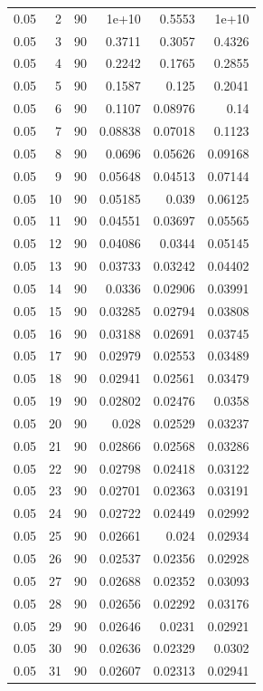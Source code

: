 \begin{tabular}{rrrrrr}
0.05 & 2 & 90 & 1e+10 & 0.5553 & 1e+10 \\
0.05 & 3 & 90 & 0.3711 & 0.3057 & 0.4326 \\
0.05 & 4 & 90 & 0.2242 & 0.1765 & 0.2855 \\
0.05 & 5 & 90 & 0.1587 & 0.125 & 0.2041 \\
0.05 & 6 & 90 & 0.1107 & 0.08976 & 0.14 \\
0.05 & 7 & 90 & 0.08838 & 0.07018 & 0.1123 \\
0.05 & 8 & 90 & 0.0696 & 0.05626 & 0.09168 \\
0.05 & 9 & 90 & 0.05648 & 0.04513 & 0.07144 \\
0.05 & 10 & 90 & 0.05185 & 0.039 & 0.06125 \\
0.05 & 11 & 90 & 0.04551 & 0.03697 & 0.05565 \\
0.05 & 12 & 90 & 0.04086 & 0.0344 & 0.05145 \\
0.05 & 13 & 90 & 0.03733 & 0.03242 & 0.04402 \\
0.05 & 14 & 90 & 0.0336 & 0.02906 & 0.03991 \\
0.05 & 15 & 90 & 0.03285 & 0.02794 & 0.03808 \\
0.05 & 16 & 90 & 0.03188 & 0.02691 & 0.03745 \\
0.05 & 17 & 90 & 0.02979 & 0.02553 & 0.03489 \\
0.05 & 18 & 90 & 0.02941 & 0.02561 & 0.03479 \\
0.05 & 19 & 90 & 0.02802 & 0.02476 & 0.0358 \\
0.05 & 20 & 90 & 0.028 & 0.02529 & 0.03237 \\
0.05 & 21 & 90 & 0.02866 & 0.02568 & 0.03286 \\
0.05 & 22 & 90 & 0.02798 & 0.02418 & 0.03122 \\
0.05 & 23 & 90 & 0.02701 & 0.02363 & 0.03191 \\
0.05 & 24 & 90 & 0.02722 & 0.02449 & 0.02992 \\
0.05 & 25 & 90 & 0.02661 & 0.024 & 0.02934 \\
0.05 & 26 & 90 & 0.02537 & 0.02356 & 0.02928 \\
0.05 & 27 & 90 & 0.02688 & 0.02352 & 0.03093 \\
0.05 & 28 & 90 & 0.02656 & 0.02292 & 0.03176 \\
0.05 & 29 & 90 & 0.02646 & 0.0231 & 0.02921 \\
0.05 & 30 & 90 & 0.02636 & 0.02329 & 0.0302 \\
0.05 & 31 & 90 & 0.02607 & 0.02313 & 0.02941 \\

\end{tabular}
